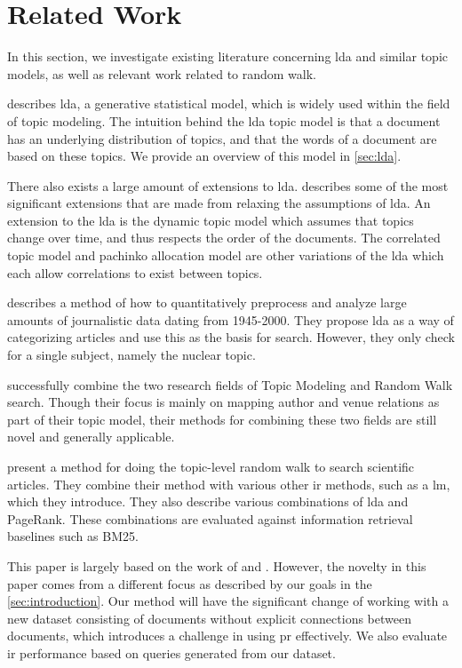 \section{Related Work}\label{sec:related-works}
In this section, we investigate existing literature concerning \gls{lda} and similar topic models, as well as relevant work related to random walk.

\citet{lda} describes \acrlong{lda}, a generative statistical model, which is widely used within the field of topic modeling. 
The intuition behind the \gls{lda} topic model is that a document has an underlying distribution of topics, and that the words of a document are based on these topics.
We provide an overview of this model in \autoref{sec:lda}.

There also exists a large amount of extensions to \gls{lda}.
\citet{blei2012topicmodels} describes some of the most significant extensions that are made from relaxing the assumptions of \gls{lda}.
An extension to the \gls{lda} is the dynamic topic model\cite{blei2006dynamic} which assumes that topics change over time, and thus respects the order of the documents. 
The correlated topic model\cite{blei2007correlated} and pachinko allocation model\cite{li2006pachinko} are other variations of the \gls{lda} which each allow correlations to exist between topics.


\citet{quanti} describes a method of how to quantitatively preprocess and analyze large amounts of journalistic data dating from 1945-2000. 
They propose \gls{lda} as a way of categorizing articles and use this as the basis for search.
However, they only check for a single subject, namely the nuclear topic.  


\citet{Tang2008} successfully combine the two research fields of Topic Modeling and Random Walk search. 
Though their focus is mainly on mapping author and venue relations as part of their topic model, their methods for combining these two fields are still novel and generally applicable.


\citet{yang2009topic} present a method for doing the topic-level random walk to search scientific articles.
They combine their method with various other \gls{ir} methods, such as a \gls{lm}, which they introduce.
They also describe various combinations of \gls{lda} and PageRank.
These combinations are evaluated against information retrieval baselines such as BM25\cite{bm251996}.


This paper is largely based on the work of \citeauthor{yang2009topic}\cite{yang2009topic} and \citeauthor{Tang2008}\cite{Tang2008}.
However, the novelty in this paper comes from a different focus as described by our goals in the \autoref{sec:introduction}.
Our method will have the significant change of working with a new dataset consisting of documents without explicit connections between documents, which introduces a challenge in using \gls{pr} effectively.
We also evaluate \gls{ir} performance based on queries generated from our dataset.

